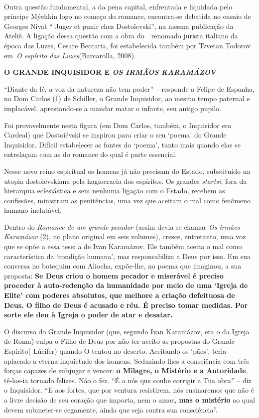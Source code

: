 ~

Outra questão fundamental, a da pena capital, enfrentada e liquidada
pelo príncipe Mýchkin logo no começo do romance, encontra-se debatida no
ensaio de Georges Nivat `` Juger et punir chez Dostoïevski'', na mesma
publicação da Ateliê. A ligação dessa questão com a obra do~~renomado
jurista italiano da época das Luzes, Cesare Beccaria, foi estabelecida
também por Tzvetan Todorov em~\emph{O espírito das Luzes}(Barcarolla,
2008).

\textbf{O GRANDE INQUISIDOR E \emph{OS IRMÃOS KARAMÁZOV}}

``Diante da fé, a voz da natureza não tem poder'' -- responde a Felipe
de Espanha, no Dom Carlos (1) de Schiller, o Grande Inquisidor, ao mesmo
tempo paternal e implacável, aprestando-se a mandar matar o infante, seu
antigo pupilo.

Foi provavelmente nesta figura (em Dom Carlos, também, o Inquisidor era
Cardeal) que Dostoiévski se inspirou para criar o seu `poema' do Grande
Inquisidor. Difícil estabelecer as fontes do `poema', tanto mais quando
elas se entrelaçam com as do romance do qual é parte essencial.

Nesse novo reino espiritual os homens já não precisam do Estado,
substituído na utopia dostoievskiana pela hagiocracia dos espíritos. Os
grandes \emph{startsi}, fora da hierarquia eclesiástica e sem nenhuma
ligação com o Estado, recebem as confissões, ministram as penitências,
uma vez que aceitam o mal como fenômeno humano inelutável.

Dentro do \emph{Romance de um grande pecador} (assim devia se chamar
\emph{Os irmãos Karamázov} (2), no plano original em seis volumes),
cresce, entretanto, uma voz que se opõe a essa tese: a de Ivan
Karamázov. Ele também aceita o mal como característica da `condição
humana', mas responsabiliza a Deus por isso. Em sua conversa no botequim
com Aliocha, expõe-lhe, no poema que imaginou, a sua proposta:
\textbf{Se Deus criou o homem pecador e miserável é preciso proceder à
auto-redenção da humanidade por meio de uma `Igreja de Elite' com
poderes absolutos, que melhore a criação defeituosa de Deus. O filho de
Deus é acusado e réu. É preciso tomar medidas. Por sorte ele deu à
Igreja o poder de atar e desatar.}

O discurso do Grande Inquisidor (que, segundo Ivan Karamázov, era o da
Igreja de Roma) culpa o Filho de Deus por não ter aceito as propostas do
Grande Espírito( Lúcifer) quando O tentou no deserto. Aceitando os
`pães', teria aplacado a eterna inquietude dos homens. Seduzindo-lhes a
consciência com três forças capazes de subjugar e vencer: \textbf{o
Milagre, o Mistério e a Autoridade}, tê-los-ia tornado felizes. Não o
fez. ``É a nós que coube corrigir a Tua obra'' -- diz o Inquisidor. ``E
aos fortes, que por ventura resistirem, nós ensinaremos que não é a
livre decisão de seu coração que importa, nem o amor\textbf{, mas o
mistério} ao qual devem submeter-se cegamente, ainda que seja contra sua
consciência''.

